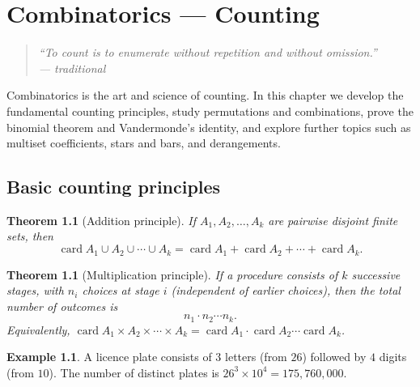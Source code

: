 \documentclass[12pt,a4paper,openany]{book}
\theoremstyle{definition}
\newtheorem{example}[definition]{Example}
\theoremstyle{plain}
\newtheorem{theorem}[definition]{Theorem}
\theoremstyle{remark}
\DeclareMathOperator{\card}{card}
\begin{document}
\bigskip


\chapter{Combinatorics --- Counting}
\label{ch:combinatorics}

\begin{quote}
\itshape
``To count is to enumerate without repetition and without omission.''\\
--- traditional
\end{quote}

\medskip
\noindent
Combinatorics is the art and science of counting. In this chapter we develop
the fundamental counting principles, study permutations and combinations,
prove the binomial theorem and Vandermonde's identity, and explore further
topics such as multiset coefficients, stars and bars, and derangements.

\section{Basic counting principles}
\label{sec:counting-principles}

\begin{theorem}[Addition principle]\label{thm:addition}
If $A_1, A_2, \ldots, A_k$ are pairwise disjoint finite sets, then
\[
  \card{A_1 \cup A_2 \cup \cdots \cup A_k}
    = \card{A_1} + \card{A_2} + \cdots + \card{A_k}.
\]
\end{theorem}

\begin{theorem}[Multiplication principle]\label{thm:multiplication}
If a procedure consists of $k$ successive stages, with $n_i$ choices at
stage $i$ (independent of earlier choices), then the total number of outcomes
is
\[
  n_1 \cdot n_2 \cdots n_k.
\]
Equivalently, $\card{A_1 \times A_2 \times \cdots \times A_k}
= \card{A_1} \cdot \card{A_2} \cdots \card{A_k}$.
\end{theorem}

\begin{example}\label{ex:licence-plates}
A licence plate consists of $3$ letters (from $26$) followed by $4$ digits
(from $10$). The number of distinct plates is $26^3 \times 10^4 = 175{,}760{,}000$.
\end{example}
\end{document}
